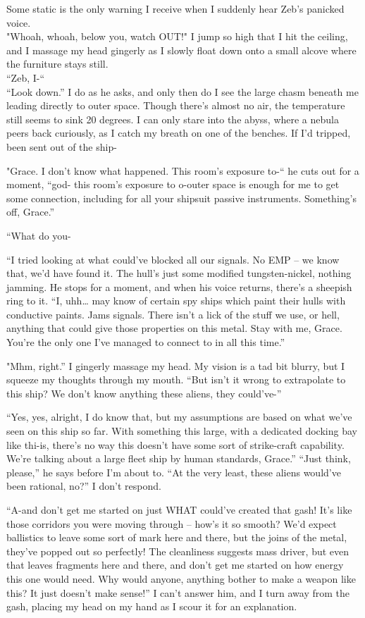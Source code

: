 Some static is the only warning I receive when I suddenly hear Zeb’s panicked voice.\\
"Whoah, whoah, below you, watch OUT!" I jump so high that I hit the ceiling, and I massage my head gingerly as I slowly float down onto a small alcove where the furniture stays still.  \\
“Zeb, I-“ \\
“Look down.” I do as he asks, and only then do I see the large chasm beneath me leading directly to outer space. Though there's almost no air, the temperature still seems to sink 20 degrees. I can only stare into the abyss, where a nebula peers back curiously, as I catch my breath on one of the benches. If I’d tripped, been sent out of the ship-  

"Grace. I don’t know what happened. This room’s exposure to-“ he cuts out for a moment, “god- this room’s exposure to o-outer space is enough for me to get some connection, including for all your shipsuit passive instruments. Something’s off, Grace.” 

“What do you- 

 “I tried looking at what could’ve blocked all our signals. No EMP – we know that, we’d have found it. The hull’s just some modified tungsten-nickel, nothing jamming. He stops for a moment, and when his voice returns, there’s a sheepish ring to it. “I, uhh… may know of certain spy ships which paint their hulls with conductive paints. Jams signals. There isn’t a lick of the stuff we use, or hell, anything that could give those properties on this metal. Stay with me, Grace. You’re the only one I’ve managed to connect to in all this time.” 
 
"Mhm, right.” I gingerly massage my head. My vision is a tad bit blurry, but I squeeze my thoughts through my mouth. “But isn’t it wrong to extrapolate to this ship? We don’t know anything these aliens, they could’ve-”

“Yes, yes, alright, I do know that, but my assumptions are based on what we’ve seen on this ship so far. With something this large, with a dedicated docking bay like thi-is, there’s no way this doesn’t have some sort of strike-craft capability. We’re talking about a large fleet ship by human standards, Grace.” “Just think, please,” he says before I’m about to. “At the very least, these aliens would’ve been rational, no?” I don’t respond.  

 

“A-and don’t get me started on just WHAT could’ve created that gash! It’s like those corridors you were moving through – how’s it so smooth? We’d expect ballistics to leave some sort of mark here and there, but the joins of the metal, they’ve popped out so perfectly! The cleanliness suggests mass driver, but even that leaves fragments here and there, and don’t get me started on how energy this one would need. Why would anyone, anything bother to make a weapon like this? It just doesn’t make sense!” I can’t answer him, and I turn away from the gash, placing my head on my hand as I scour it for an explanation. 

